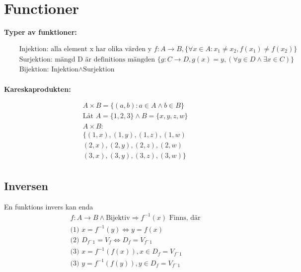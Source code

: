 \newpage

\section{Functioner}
\textbf{Typer av funktioner:}\par 
\begin{align*}
  &\quad  \text{Injektion: alla element x har olika värden y } f: A \to B, \{{\forall x \in A: x_1 \neq x_2, f(x_1) \neq f(x_2)}\} \\
  &\quad  \text{Surjektion: mängd D är definitions mängden } \{g: C \to D, g(x)=y, (\forall y \in D \land \exists x \in C)\} \\
  &\quad  \text{Bijektion: } \text{Injektion} \land \text{Surjektion}  \\
\end{align*}
 
\textbf{Kareskaprodukten:}\par
\begin{align*}
  &\quad  A \times B = \{ (a,b): a \in A \land b \in B \} \\
  &\quad  \text{Låt } A = \{ 1,2,3 \} \land B = \{ x,y,z,w \} \\
  &\quad  A \times B : \\
  &\quad  \{ (1,x), (1,y), (1,z), (1,w) \\
  &\quad  (2,x), (2,y), (2,z), (2,w) \\
  &\quad  (3,x), (3,y), (3,z), (3,w) \} \\
\end{align*}

\subsection{Inversen}
En funktions invers kan enda
\begin{align*}
  &\quad  f: A \to B \land \text{Bijektiv} \Rightarrow f^{-1}(x) \text{ Finns, där}  \\
  &\quad \text{(1) }  x = f^{-1}(y) \Leftrightarrow y = f(x) \\
  &\quad \text{(2) }  D_{f^-1} = V_f \Leftrightarrow D_f = V_{f^-1} \\
  &\quad \text{(3) }  x = f^{-1}(f(x)), x \in D_f = V_{f^-1} \\ 
  &\quad \text{(3) }  y = f^{-1}(f(y)), y \in D_f = V_{f^-1} \\ 
\end{align*}

